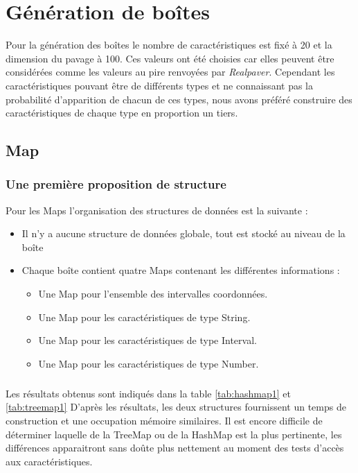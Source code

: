 \chapter{Génération de boîtes}
Pour la génération des boîtes le nombre de caractéristiques est fixé à 20 et la dimension du pavage à 100. Ces valeurs ont été choisies car elles peuvent être considérées comme les valeurs au pire renvoyées par \emph{Realpaver}. Cependant les caractéristiques pouvant être de différents types et ne connaissant pas la probabilité d'apparition de chacun de ces types, nous avons préféré construire des caractéristiques de chaque type en proportion un tiers. 

\section{Map}

\subsection{Une première proposition de structure}
Pour les Maps l'organisation des structures de données est la suivante :
\begin{itemize}
\item Il n'y a aucune structure de données globale, tout est stocké au niveau de la boîte
 \item Chaque boîte contient quatre Maps contenant les différentes informations :
\begin{itemize}
 \item Une Map pour l'ensemble des intervalles coordonnées.
\item Une Map pour les caractéristiques de type String.
\item Une Map pour les caractéristiques de type Interval.
\item Une Map pour les caractéristiques de type Number.
\end{itemize}
\end{itemize}

\paragraph{}Les résultats obtenus sont indiqués dans la table \ref{tab:hashmap1} et \ref{tab:treemap1}
D'après les résultats, les deux structures fournissent un temps de construction et une occupation mémoire similaires.
Il est encore difficile de déterminer laquelle de la TreeMap ou de la HashMap est la plus pertinente, les différences apparaitront sans doûte plus nettement au moment des tests d'accès aux caractéristiques. 



